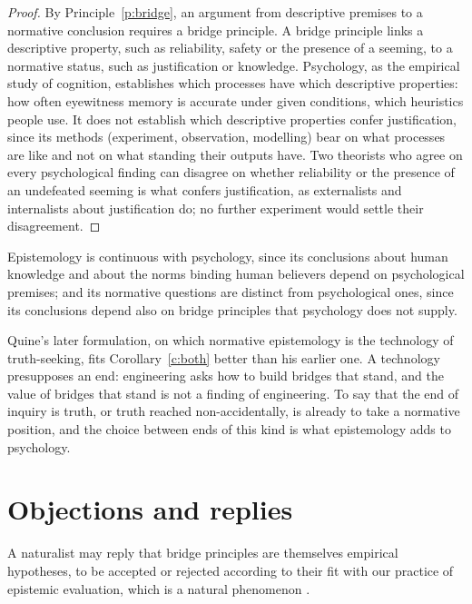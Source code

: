 \documentclass{situationist-preprint}
\begin{document}
\begin{proof}
By Principle~\ref{p:bridge}, an argument from descriptive premises to a normative conclusion requires a bridge principle. A bridge principle links a descriptive property, such as reliability, safety or the presence of a seeming, to a normative status, such as justification or knowledge. Psychology, as the empirical study of cognition, establishes which processes have which descriptive properties: how often eyewitness memory is accurate under given conditions, which heuristics people use. It does not establish which descriptive properties confer justification, since its methods (experiment, observation, modelling) bear on what processes are like and not on what standing their outputs have. Two theorists who agree on every psychological finding can disagree on whether reliability or the presence of an undefeated seeming is what confers justification, as externalists and internalists about justification do; no further experiment would settle their disagreement.
\end{proof}

\begin{corollary}\label{c:both}
Epistemology is continuous with psychology, since its conclusions about human knowledge and about the norms binding human believers depend on psychological premises; and its normative questions are distinct from psychological ones, since its conclusions depend also on bridge principles that psychology does not supply.
\end{corollary}

Quine's later formulation, on which normative epistemology is the technology of truth-seeking, fits Corollary~\ref{c:both} better than his earlier one. A technology presupposes an end: engineering asks how to build bridges that stand, and the value of bridges that stand is not a finding of engineering. To say that the end of inquiry is truth, or truth reached non-accidentally, is already to take a normative position, and the choice between ends of this kind is what epistemology adds to psychology.

\section{Objections and replies}

\begin{objection}\label{o:empirical}
A naturalist may reply that bridge principles are themselves empirical hypotheses, to be accepted or rejected according to their fit with our practice of epistemic evaluation, which is a natural phenomenon \citep{Kornblith2002}.
\end{objection}
\end{document}

